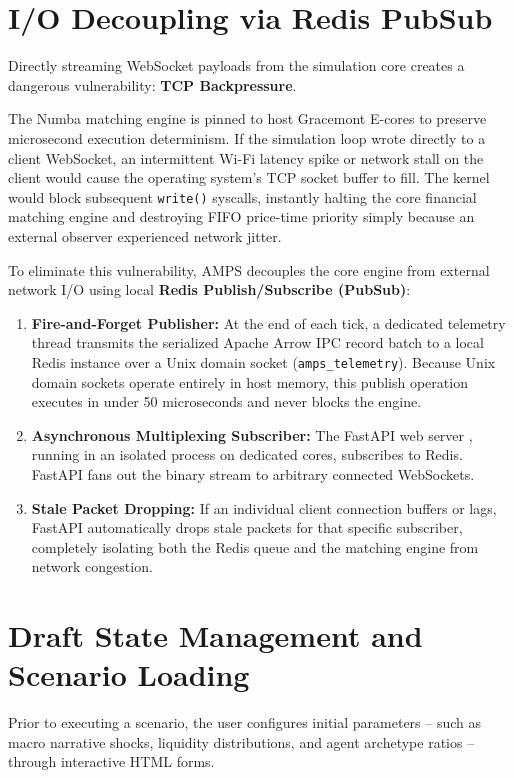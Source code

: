 \section{I/O Decoupling via Redis PubSub}

Directly streaming WebSocket payloads from the simulation core creates a dangerous vulnerability: \textbf{TCP Backpressure}.

The Numba matching engine is pinned to host Gracemont E-cores to preserve microsecond execution determinism. If the simulation loop wrote directly to a client WebSocket, an intermittent Wi-Fi latency spike or network stall on the client would cause the operating system's TCP socket buffer to fill. The kernel would block subsequent \texttt{write()} syscalls, instantly halting the core financial matching engine and destroying FIFO price-time priority simply because an external observer experienced network jitter.

To eliminate this vulnerability, AMPS decouples the core engine from external network I/O using local \textbf{Redis Publish/Subscribe (PubSub)}:

\begin{enumerate}
    \item \textbf{Fire-and-Forget Publisher:} At the end of each tick, a dedicated telemetry thread transmits the serialized Apache Arrow IPC record batch to a local Redis instance over a Unix domain socket (\texttt{amps\_telemetry}). Because Unix domain sockets operate entirely in host memory, this publish operation executes in under 50 microseconds and never blocks the engine.
    \item \textbf{Asynchronous Multiplexing Subscriber:} The FastAPI web server \cite{selivanov2016uvloop}, running in an isolated process on dedicated cores, subscribes to Redis. FastAPI fans out the binary stream to arbitrary connected WebSockets.
    \item \textbf{Stale Packet Dropping:} If an individual client connection buffers or lags, FastAPI automatically drops stale packets for that specific subscriber, completely isolating both the Redis queue and the matching engine from network congestion.
\end{enumerate}

\section{Draft State Management and Scenario Loading}

Prior to executing a scenario, the user configures initial parameters -- such as macro narrative shocks, liquidity distributions, and agent archetype ratios -- through interactive HTML forms.

